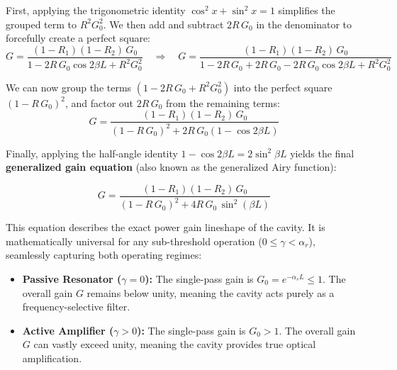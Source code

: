 First, applying the trigonometric identity $\cos^2 x + \sin^2 x = 1$ simplifies the grouped term to $R^2 G_0^2$. We then add and subtract $2R\,G_0$ in the denominator to forcefully create a perfect square:
\begin{equation*}
    G = \frac{(1-R_1)(1-R_2)\,G_0}{1 - 2 R\,G_0 \cos 2\beta L + R^2 G_0^2} \quad \Rightarrow \quad G = \frac{(1-R_1)(1-R_2)\,G_0}{1 - 2 R\,G_0 + 2 R\,G_0 - 2 R\,G_0 \cos 2\beta L + R^2 G_0^2}
\end{equation*}

We can now group the terms $(1 - 2R\,G_0 + R^2 G_0^2)$ into the perfect square $(1-R\,G_0)^2$, and factor out $2R\,G_0$ from the remaining terms:
\begin{equation*}
    G = \frac{(1-R_1)(1-R_2)\,G_0}{(1-R\,G_0)^2 + 2 R\,G_0 (1 - \cos 2\beta L)}
\end{equation*}

Finally, applying the half-angle identity $1 - \cos 2\beta L = 2 \sin^2 \beta L$ yields the final \textbf{generalized gain equation} (also known as the generalized Airy function):
\begin{keyresult}
    \begin{equation}
        G = \frac{(1-R_1)(1-R_2)\,G_0}{\left(1 - R\,G_0\right)^2 + 4R\,G_0\,\sin^2(\beta L)}
    \end{equation}
\end{keyresult}
This equation describes the exact power gain lineshape of the cavity. It is mathematically universal for any sub-threshold operation ($0 \leq \gamma < \alpha_r$), seamlessly capturing both operating regimes:
\begin{itemize}
    \item \textbf{Passive Resonator ($\gamma = 0$):} The single-pass gain is $G_0 = e^{-\alpha_s L} \leq 1$. The overall gain $G$ remains below unity, meaning the cavity acts purely as a frequency-selective filter.
    \item \textbf{Active Amplifier ($\gamma > 0$):} The single-pass gain is $G_0 > 1$. The overall gain $G$ can vastly exceed unity, meaning the cavity provides true optical amplification.
\end{itemize}

